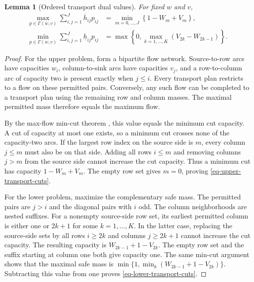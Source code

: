 \documentclass[review,11pt,3p,authoryear,nopreprintline]{elsarticle}
\newtheorem{lemma}{Lemma}
\begin{document}
\begin{lemma}[Ordered transport dual values]
  \label{lem-ordered-transport}
  For fixed $w$ and $v$,
  \begin{align}
    \max_{p\in\Gamma(w,v)}\sum_{i,j=1}^J\overline h_{ij}p_{ij}
    &=\min_{m=0,\ldots,J}\left\{1-W_m+V_m\right\},
    \label{eq-upper-transport-cuts}\\
    \min_{p\in\Gamma(w,v)}\sum_{i,j=1}^J\underline h_{ij}p_{ij}
    &=\max\left\{0,\max_{k=1,\ldots,K}\left(V_{2k}-W_{2k-1}\right)\right\}.
    \label{eq-lower-transport-cuts}
  \end{align}
\end{lemma}
\begin{proof}
  For the upper problem, form a bipartite flow network. Source-to-row arcs have capacities $w_i$, column-to-sink arcs have capacities $v_j$, and a row-to-column arc of capacity two is present exactly when $j\le i$. Every transport plan restricts to a flow on these permitted pairs. Conversely, any such flow can be completed to a transport plan using the remaining row and column masses. The maximal permitted mass therefore equals the maximum flow.

  By the max-flow min-cut theorem \citep{F.F56}, this value equals the minimum cut capacity. A cut of capacity at most one exists, so a minimum cut crosses none of the capacity-two arcs. If the largest row index on the source side is $m$, every column $j\le m$ must also be on that side. Adding all rows $i\le m$ and removing columns $j>m$ from the source side cannot increase the cut capacity. Thus a minimum cut has capacity $1-W_m+V_m$. The empty row set gives $m=0$, proving \eqref{eq-upper-transport-cuts}.

  For the lower problem, maximize the complementary safe mass. The permitted pairs are $j>i$ and the diagonal pairs with $i$ odd. The column neighborhoods are nested suffixes. For a nonempty source-side row set, its earliest permitted column is either one or $2k+1$ for some $k=1,\ldots,K$. In the latter case, replacing the source-side sets by all rows $i\ge2k$ and columns $j\ge2k+1$ cannot increase the cut capacity. The resulting capacity is
  $W_{2k-1}+1-V_{2k}$. The empty row set and the suffix starting at column one both give capacity one. The same min-cut argument shows that the maximal safe mass is
  $\min\{1,\min_k(W_{2k-1}+1-V_{2k})\}$.
  Subtracting this value from one proves \eqref{eq-lower-transport-cuts}.
\end{proof}
\end{document}
